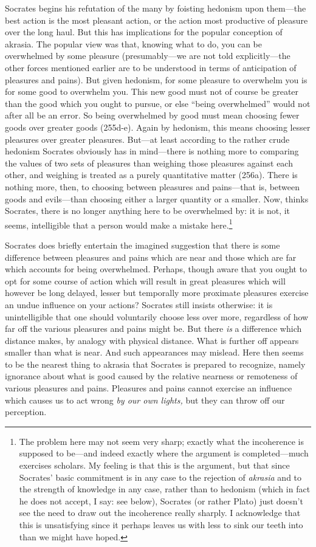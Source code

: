 \documentclass[11pt]{amsart}
\begin{document}
Socrates begins his refutation of the many by foisting hedonism upon
them---the best action is the most pleasant action, or the action most
productive of pleasure over the long haul. But this has implications
for the popular conception of akrasia. The popular view was that,
knowing what to do, you can be overwhelmed by some pleasure
(presumably---we are not told explicitly---the other forces mentioned
earlier are to be understood in terms of anticipation of pleasures and
pains). But given hedonism, for some pleasure to overwhelm you is for
some good to overwhelm you. This new good must not of course be
greater than the good which you ought to pursue, or else ``being
overwhelmed'' would not after all be an error. So being overwhelmed by
good must mean choosing fewer goods over greater goods (255d-e). Again
by hedonism, this means choosing lesser pleasures over greater
pleasures. But---at least according to the rather crude hedonism
Socrates obviously has in mind---there is nothing more to comparing
the values of two sets of pleasures than weighing those pleasures
against each other, and weighing is treated as a purely quantitative
matter (256a). There is nothing more, then, to choosing between
pleasures and pains---that is, between goods and evils---than choosing
either a larger quantity or a smaller. Now, thinks Socrates, there is
no longer anything here to be overwhelmed by: it is not, it seems,
intelligible that a person would make a mistake here.\footnote{The
problem here may not seem very sharp; exactly what the incoherence is
supposed to be---and indeed exactly where the argument is
completed---much exercises scholars. My feeling is that this is the
argument, but that since Socrates' basic commitment is in any case to
the rejection of \emph{akrasia} and to the strength of knowledge in
any case, rather than to hedonism (which in fact he does not accept, I
say: see below), Socrates (or rather Plato) just doesn't see the need
to draw out the incoherence really sharply. I acknowledge that this is
unsatisfying since it perhaps leaves us with less to sink our teeth
into than we might have hoped.}

Socrates does briefly entertain the imagined suggestion that there is
some difference between pleasures and pains which are near and those
which are far which accounts for being overwhelmed. Perhaps, though
aware that you ought to opt for some course of action which will
result in great pleasures which will however be long delayed, lesser
but temporally more proximate pleasures exercise an undue influence on
your actions? Socrates still insists otherwise: it is unintelligible
that one should voluntarily choose less over more, regardless of how
far off the various pleasures and pains might be. But there \emph{is}
a difference which distance makes, by analogy with physical distance.
What is further off appears smaller than what is near. And such
appearances may mislead. Here then seems to be the nearest thing to
akrasia that Socrates is prepared to recognize, namely ignorance about
what is good caused by the relative nearness or remoteness of various
pleasures and pains. Pleasures and pains cannot exercise an influence
which causes us to act wrong \emph{by our own lights,} but they can
throw off our perception.
\end{document}
